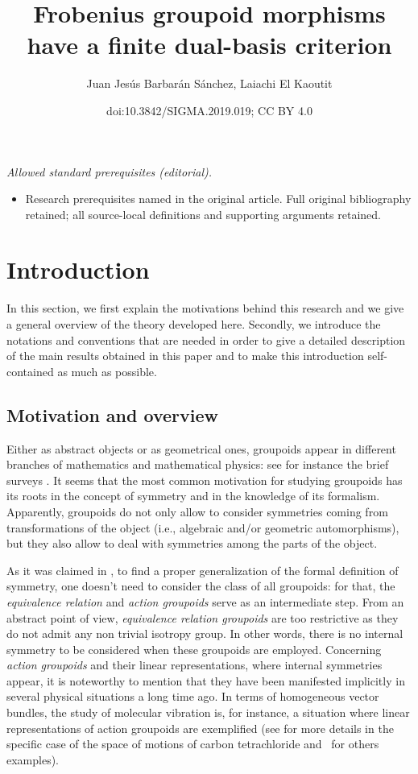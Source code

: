 \documentclass[10pt,a4paper]{amsart}
\title{Frobenius groupoid morphisms have a finite dual-basis criterion}
\author{Juan Jesús Barbarán Sánchez, Laiachi El Kaoutit}
\date{doi:10.3842/SIGMA.2019.019; CC BY 4.0}
\numberwithin{equation}{section}
\begin{document}
\maketitle
\noindent\textit{Allowed standard prerequisites (editorial).}\begin{itemize}
\item Research prerequisites named in the original article. Full original bibliography retained; all source-local definitions and supporting arguments retained.
\end{itemize}\medskip
\section{Introduction}

In this section, we first explain the motivations behind this research and we give a general overview of the theory developed here. Secondly, we introduce the notations and conventions that are needed in order to give a detailed description of the main results obtained in this paper and to make this introduction self-contained as much as possible.

\subsection{Motivation and overview}\label{ssec:1} Either as abstract objects or as geometrical ones, groupoids appear in different branches of mathematics and mathematical physics: see for instance the brief surveys \cite{Brown:1987, Landsman:2005,Weinstein:1996}. It seems that the most common motivation for studying groupoids has its roots in the concept of symmetry and in the knowledge of its formalism. Apparently, groupoids do not only allow to consider symmetries coming from transformations of the object (i.e., algebraic and/or geometric automorphisms), but they also allow to deal with symmetries among the parts of the object.

As it was claimed in \cite{Guay/Hepburn:2009}, to find a proper generalization of the formal definition of symmetry, one doesn't need to consider the class of all groupoids: for that, the \emph{equivalence relation} and \emph{action groupoids} serve as an intermediate step. From an abstract point of view, \emph{equivalence relation groupoids} are too restrictive as they do not admit any non trivial isotropy group. In other words, there is no internal symmetry to be considered when these groupoids are employed. Concerning \emph{action groupoids} and their linear representations, where internal symmetries appear, it is noteworthy to mention that they have been manifested implicitly in several physical situations a long time ago. In terms of homogeneous vector bundles, the study of molecular vibration is, for instance, a situation where linear representations of action groupoids are exemplified (see \cite[Section~3.2, p.~97]{Sternberg:1994} for more details in the specific case of the space of motions of carbon tetrachloride and~\cite{Pysiak:2011} for others examples).
\end{document}
